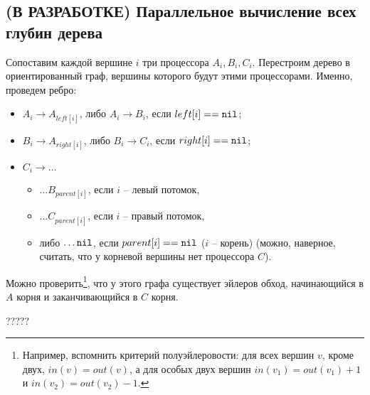 \subsection{(В РАЗРАБОТКЕ) Параллельное вычисление всех глубин дерева}

 Сопоставим каждой вершине $i$ три процессора $A_i, B_i, C_i$. Перестроим дерево в ориентированный граф, вершины которого будут этими процессорами. Именно, проведем ребро:
\begin{itemize}
\item $A_i \rightarrow A_{left[i]}$, либо $A_i \rightarrow B_i$, если $left[i] == \mathtt{nil}$;
\item $B_i \rightarrow A_{right[i]}$, либо $B_i \rightarrow C_i$, если $right[i] == \mathtt{nil}$;
\item $C_i \rightarrow \ldots$
\begin{itemize}
\item $\ldots B_{parent[i]}$, если $i$ -- левый потомок,
\item $\ldots C_{parent[i]}$, если $i$ -- правый потомок,
\item либо $\ldots \mathtt{nil}$, если $parent[i] == \mathtt{nil}$ ($i$ -- корень) (можно, наверное, считать, что у корневой вершины нет процессора $C$).
\end{itemize}
\end{itemize}

Можно проверить\footnote{Например, вспомнить критерий полуэйлеровости: для всех вершин $v$, кроме двух, $in(v) = out(v)$, а для особых двух вершин $in(v_1) = out(v_1) + 1$ и $in(v_2) = out(v_2) - 1$.}, что у этого графа существует эйлеров обход, начинающийся в $A$ корня и заканчивающийся в $C$ корня.

?????
